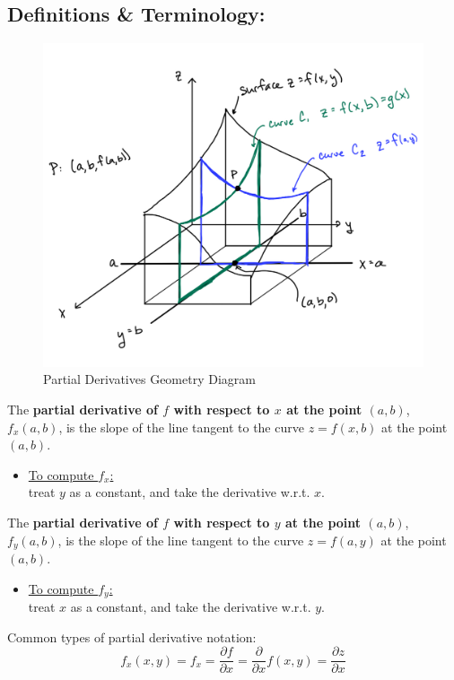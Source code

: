 \hspace*{-.8in}%

\subsection*{Definitions \& Terminology:}
\begin{figure}[!h]
\includegraphics[width=.5\textwidth]{Partial-Derivatives-Geometry.png}
\caption{Partial Derivatives Geometry Diagram}
\end{figure}

The \textbf{partial derivative of \(f\) with respect to \(x\) at the point \((a,b)\)}, \(f_x (a,b)\), is the slope of the line tangent to the curve \(z=f(x,b)\) at the point \((a,b)\).
\begin{itemize}
\item \underline{To compute \(f_x\):}\\ treat \(y\) as a constant, and take the derivative w.r.t. \(x\).
\end{itemize}
The \textbf{partial derivative of \(f\) with respect to \(y\) at the point \((a,b)\)}, \(f_y (a,b)\), is the slope of the line tangent to the curve \(z=f(a,y)\) at the point \((a,b)\).
\begin{itemize}
\item \underline{To compute \(f_y\):}\\ treat \(x\) as a constant, and take the derivative w.r.t. \(y\).
\end{itemize}
Common types of partial derivative notation:
\[ f_x (x,y) = f_x = \frac{\partial f}{\partial x} = \frac{\partial}{\partial x} f(x,y) = \frac{\partial z}{\partial x}\]

